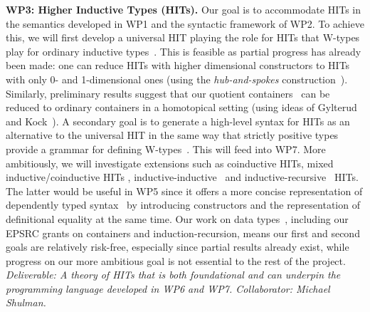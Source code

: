 \documentclass[a4paper,11pt]{article}
\begin{document}
{\bf WP3: Higher Inductive Types (HITs).} Our goal is to accommodate HITs in
the semantics developed in WP1 and the syntactic framework of WP2. To
achieve this, we will first develop a universal HIT playing the role for
HITs that W-types play for ordinary inductive
types~\cite{alti:cont-tcs}. This is feasible as partial progress has
already been made: one can reduce HITs with higher dimensional
constructors to HITs with only 0- and 1-dimensional ones (using the
\emph{hub-and-spokes} construction~\cite{hott-book}).
Similarly, preliminary results suggest that our quotient
containers~\cite{alti:mpc04} can be reduced
to ordinary containers in a homotopical setting 
(using ideas of Gylterud~\cite{gylterud:thesis} and
Kock~\cite{kock:groupoids}).
%
A secondary goal is to generate a high-level syntax for HITs as
an alternative to the universal HIT in the same way that strictly
positive types provide a grammar for defining 
W-types~\cite{alti:cont-tcs,alti:jcats07}.  This will feed into WP7.
More ambitiously, we will %
investigate extensions such as coinductive HITs, mixed
inductive/coinductive HITs \cite{txa:mpc2010g}, 
inductive-inductive~\cite{fnf:indind} and
inductive-recursive~\cite{DS:indrec} HITs. The latter would be useful
in WP5 since it offers a more concise representation of dependently
typed syntax~\cite{chapman2009type} by introducing
constructors and the representation of definitional equality at the
same time.
Our work on data
types~\cite{alti:cont-tcs,alti:lics09,alti:catind2,ghani:fibredIR,gambinoHyland:welfoundedTrees,awodeyGamSoja:indTypesInHTT},
including our EPSRC grants on containers and induction-recursion, means
our first and second goals
are relatively risk-free,
especially since partial results already exist, 
while progress on our more ambitious goal 
is not essential to the rest of the project. {\em Deliverable: A
  theory of HITs that is both foundational and can underpin the
  programming language developed in WP6 and WP7. 
Collaborator: Michael Shulman. 
}
\end{document}
